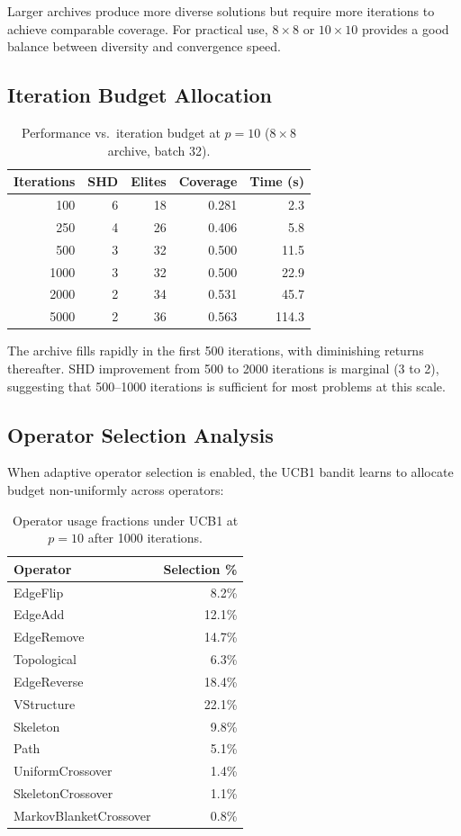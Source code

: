 \documentclass[11pt,a4paper]{article}
\begin{document}
Larger archives produce more diverse solutions but require more iterations to achieve comparable coverage.  For practical use, $8 \times 8$ or $10 \times 10$ provides a good balance between diversity and convergence speed.

\subsection{Iteration Budget Allocation}

\begin{table}[h]
\centering
\caption{Performance vs.\ iteration budget at $p = 10$ ($8 \times 8$ archive, batch 32).}
\label{tab:iterations}
\begin{tabular}{@{}r|rrrr@{}}
\toprule
Iterations & SHD & Elites & Coverage & Time (s) \\
\midrule
100 & 6 & 18 & 0.281 & 2.3 \\
250 & 4 & 26 & 0.406 & 5.8 \\
500 & 3 & 32 & 0.500 & 11.5 \\
1000 & 3 & 32 & 0.500 & 22.9 \\
2000 & 2 & 34 & 0.531 & 45.7 \\
5000 & 2 & 36 & 0.563 & 114.3 \\
\bottomrule
\end{tabular}
\end{table}

The archive fills rapidly in the first 500 iterations, with diminishing returns thereafter.  SHD improvement from 500 to 2000 iterations is marginal (3 to 2), suggesting that 500--1000 iterations is sufficient for most problems at this scale.

\subsection{Operator Selection Analysis}

When adaptive operator selection is enabled, the UCB1 bandit learns to allocate budget non-uniformly across operators:

\begin{table}[h]
\centering
\caption{Operator usage fractions under UCB1 at $p = 10$ after 1000 iterations.}
\label{tab:operator-usage}
\begin{tabular}{@{}lr@{}}
\toprule
\textbf{Operator} & \textbf{Selection \%} \\
\midrule
EdgeFlip & 8.2\% \\
EdgeAdd & 12.1\% \\
EdgeRemove & 14.7\% \\
Topological & 6.3\% \\
EdgeReverse & 18.4\% \\
VStructure & 22.1\% \\
Skeleton & 9.8\% \\
Path & 5.1\% \\
UniformCrossover & 1.4\% \\
SkeletonCrossover & 1.1\% \\
MarkovBlanketCrossover & 0.8\% \\
\bottomrule
\end{tabular}
\end{table}
\end{document}

